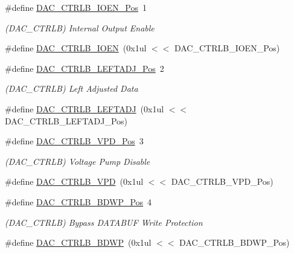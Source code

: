 \begin{DoxyCompactItemize}
\item 
\#define \mbox{\hyperlink{group___s_a_m_d21___d_a_c_ga2bf8d42afa911f1ae377e42d31053bc0}{D\+A\+C\+\_\+\+C\+T\+R\+L\+B\+\_\+\+I\+O\+E\+N\+\_\+\+Pos}}~1
\begin{DoxyCompactList}\small\item\em (D\+A\+C\+\_\+\+C\+T\+R\+LB) Internal Output Enable \end{DoxyCompactList}\item 
\#define \mbox{\hyperlink{group___s_a_m_d21___d_a_c_ga27d2a20502a137bc36bf719afde9eb86}{D\+A\+C\+\_\+\+C\+T\+R\+L\+B\+\_\+\+I\+O\+EN}}~(0x1ul $<$$<$ D\+A\+C\+\_\+\+C\+T\+R\+L\+B\+\_\+\+I\+O\+E\+N\+\_\+\+Pos)
\item 
\#define \mbox{\hyperlink{group___s_a_m_d21___d_a_c_ga0f4867bbd5c372515cd93fcff2c770ab}{D\+A\+C\+\_\+\+C\+T\+R\+L\+B\+\_\+\+L\+E\+F\+T\+A\+D\+J\+\_\+\+Pos}}~2
\begin{DoxyCompactList}\small\item\em (D\+A\+C\+\_\+\+C\+T\+R\+LB) Left Adjusted Data \end{DoxyCompactList}\item 
\#define \mbox{\hyperlink{group___s_a_m_d21___d_a_c_gadd6e4258e9fd589eade5c4748b30a4d2}{D\+A\+C\+\_\+\+C\+T\+R\+L\+B\+\_\+\+L\+E\+F\+T\+A\+DJ}}~(0x1ul $<$$<$ D\+A\+C\+\_\+\+C\+T\+R\+L\+B\+\_\+\+L\+E\+F\+T\+A\+D\+J\+\_\+\+Pos)
\item 
\#define \mbox{\hyperlink{group___s_a_m_d21___d_a_c_ga2eea424d3ea75be2b3f24995955f0d1d}{D\+A\+C\+\_\+\+C\+T\+R\+L\+B\+\_\+\+V\+P\+D\+\_\+\+Pos}}~3
\begin{DoxyCompactList}\small\item\em (D\+A\+C\+\_\+\+C\+T\+R\+LB) Voltage Pump Disable \end{DoxyCompactList}\item 
\#define \mbox{\hyperlink{group___s_a_m_d21___d_a_c_gaf0a6f1e95822b9b170bb5697b17ddda4}{D\+A\+C\+\_\+\+C\+T\+R\+L\+B\+\_\+\+V\+PD}}~(0x1ul $<$$<$ D\+A\+C\+\_\+\+C\+T\+R\+L\+B\+\_\+\+V\+P\+D\+\_\+\+Pos)
\item 
\#define \mbox{\hyperlink{group___s_a_m_d21___d_a_c_gaf242f51bcbfe6ecb54605e3cdc12b3d8}{D\+A\+C\+\_\+\+C\+T\+R\+L\+B\+\_\+\+B\+D\+W\+P\+\_\+\+Pos}}~4
\begin{DoxyCompactList}\small\item\em (D\+A\+C\+\_\+\+C\+T\+R\+LB) Bypass D\+A\+T\+A\+B\+UF Write Protection \end{DoxyCompactList}\item 
\#define \mbox{\hyperlink{group___s_a_m_d21___d_a_c_gaedde60a9d630ba437603b800b6d7c434}{D\+A\+C\+\_\+\+C\+T\+R\+L\+B\+\_\+\+B\+D\+WP}}~(0x1ul $<$$<$ D\+A\+C\+\_\+\+C\+T\+R\+L\+B\+\_\+\+B\+D\+W\+P\+\_\+\+Pos)

\end{DoxyCompactItemize}
